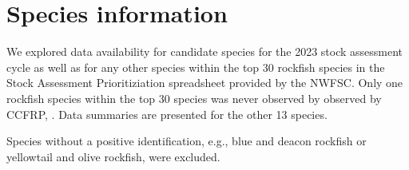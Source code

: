 \documentclass[
]{article}
\begin{document}
\FloatBarrier
\newpage

\hypertarget{species-information}{%
\section{Species information}\label{species-information}}

We explored data availability for candidate species for the 2023 stock assessment
cycle as well as for any other species within the top 30 rockfish species in the
Stock Assessment Prioritiziation spreadsheet provided by the NWFSC. Only one rockfish
species within the top 30 species was never observed by observed by CCFRP, .
Data summaries are presented for the other 13 species.

Species without a positive identification, e.g., blue and deacon rockfish or
yellowtail and olive rockfish, were excluded.
\end{document}
